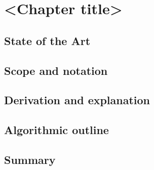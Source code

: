 \documentclass[../main.tex]{subfiles}
\begin{document}
\chapter{<Chapter title>}
\label{chap:<chapter-key>}

\section{State of the Art}

\section{Scope and notation}

\section{Derivation and explanation}

\section{Algorithmic outline}


\section{Summary}

\ifSubfilesClassLoaded{\backmatter\bookbibliography}{}
\end{document}
